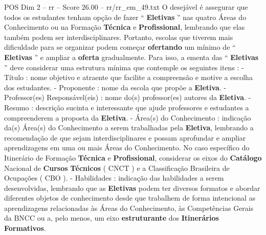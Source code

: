 \begin{textsample}{POS Dim 2 – rr – Score 26.00 – rr/rr\_em\_49.txt}
O desejável é assegurar que todos os estudantes tenham opção de fazer “ \textbf{Eletivas} ” nas quatro Áreas do Conhecimento ou na Formação \textbf{Técnica} e \textbf{Profissional}, lembrando que elas também podem ser interdisciplinares.
Portanto, escolas que tiverem mais dificuldade para se organizar podem começar \textbf{ofertando} um mínimo de “ \textbf{Eletivas} ” e ampliar a \textbf{oferta} gradualmente.
Para isso, a ementa das “ \textbf{Eletivas} ” deve considerar uma estrutura mínima que contemple os seguintes itens : - Título : nome objetivo e atraente que facilite a compreensão e motive a escolha dos estudantes. - Proponente : nome da escola que propõe a \textbf{Eletiva}. - Professor(es) Responsável(eis) : nome do(s) professor(es) autores da \textbf{Eletiva}. - Resumo : descrição sucinta e interessante que ajude professores e estudantes a compreenderem a proposta da \textbf{Eletiva}. - Área(s) do Conhecimento : indicação da(s) Área(s) do Conhecimento a serem trabalhadas pela \textbf{Eletiva}, lembrando a recomendação de que sejam interdisciplinares e possam aprofundar e ampliar aprendizagens em uma ou mais Áreas do Conhecimento.
No caso específico do Itinerário de Formação \textbf{Técnica} e \textbf{Profissional}, considerar os eixos do \textbf{Catálogo} Nacional de \textbf{Cursos} \textbf{Técnicos} ( CNCT ) e a Classificação Brasileira de Ocupações ( CBO ). - Habilidades : indicação das habilidades a serem desenvolvidas, lembrando que as \textbf{Eletivas} podem ter diversos formatos e abordar diferentes objetos de conhecimento desde que trabalhem de forma intencional as aprendizagens relacionadas às Áreas do Conhecimento, às Competências Gerais da BNCC ou a, pelo menos, um eixo \textbf{estruturante} dos \textbf{Itinerários} \textbf{Formativos}.

\end{textsample}
